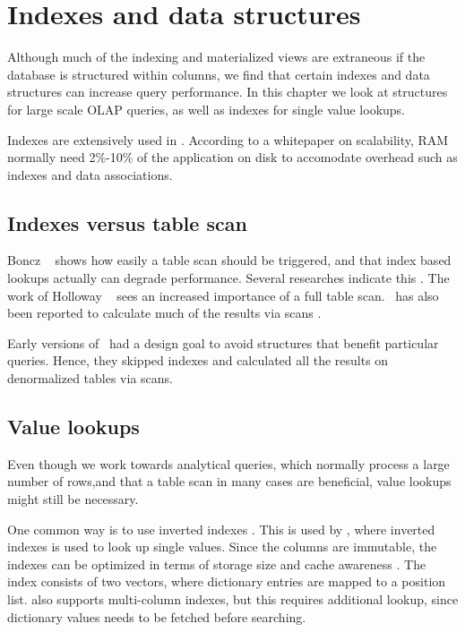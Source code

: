 \chapter{Indexes and data structures}
\label{chap:Indexes and data structures}
Although much of the indexing and materialized views are extraneous if the database is structured within columns, we find that certain indexes and data structures can increase query performance. In this chapter we look at structures for large scale OLAP queries, as well as indexes for single value lookups.

Indexes are extensively used in \qlikview. According to a whitepaper on scalability, RAM normally need 2\%-10\% of the application on disk to accomodate overhead such as indexes and data associations.

\newpage

\section{Indexes versus table scan}
\label{sec:Indexes versus table scan}
Boncz \ea~\cite{Boncz2006-md} shows how easily a table scan should be triggered, and that index based lookups actually can degrade performance. Several researches indicate this \cite{Boncz2002-yj, Abadi2008-dd}. The work of Holloway \ea~\cite{Holloway2008-rr} sees an increased importance of a full table scan. \qlikview~has also been reported to calculate much of the results via scans \cite{noauthor_undated-js}.

Early versions of \blink~had a design goal to avoid structures that benefit particular queries. Hence, they skipped indexes and calculated all the results on denormalized tables via scans.

\section{Value lookups}
\label{sec:Single value lookups}
Even though we work towards analytical queries, which normally process a large number of rows,and that a table scan in many cases are beneficial, value lookups might still be necessary.

One common way is to use inverted indexes \cite{Lemke2010-is}. This is used by \hyrise, where inverted indexes is used to look up single values. Since the columns are immutable, the indexes can be optimized in terms of storage size and cache awareness \cite{Schwalb2014-hn}. The index consists of two vectors, where dictionary entries are mapped to a position list.  \hyrise also supports multi-column indexes, but this requires additional lookup, since dictionary values needs to be fetched before searching.

